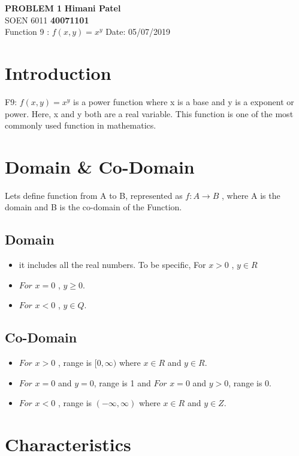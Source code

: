 \documentclass[a4paper, 11pt]{article}
\begin{document}
\noindent
\large\textbf{PROBLEM 1} \hfill \textbf{Himani Patel} \\
\normalsize SOEN 6011 \hfill \textbf{40071101} \\
Function 9 :  $f(x,y)= x^y$  \hfill Date: 05/07/2019 \\

\section{Introduction}

F9:  $f(x,y)= x^y$ is a power function where x is a base and y is a exponent or power. Here, x and y both are a real variable. This function is one of the most commonly used function in mathematics.

\section{Domain \& Co-Domain}

Lets define function from A to B, represented as  $ f: A \to B$ , where A is the domain and B is the co-domain of the Function.

\subsection{Domain}
\begin{itemize}
  \item it includes all the real numbers.
   To be specific,  For  $ x > 0$ ,  $y \in R$	
  \item $For$ $ x = 0$ , $ y \ge 0$.
  \item $For$ $ x < 0$ , $ y \in Q $.
 \end{itemize}
  
 \subsection{Co-Domain}
 \begin{itemize}
  \item  $For$ $ x > 0$ , range is $[0,\infty)$  where $ x \in R$  and  $y \in R$. 
  \item  $For$ $ x = 0$ and $y =0$, range is 1 and  $For$ $ x = 0$ and $y>0$, range is 0.
 \item  $For$ $ x < 0$ , range is $(-\infty,\infty)$  where $ x \in R$  and  $y \in Z$.
\end{itemize}

\section{Characteristics}
\end{document}
